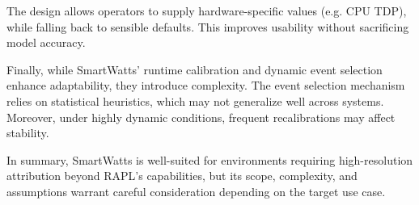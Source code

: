 The design allows operators to supply hardware-specific values (e.g. CPU TDP), while falling back to sensible defaults. This improves usability without sacrificing model accuracy.

Finally, while SmartWatts' runtime calibration and dynamic event selection enhance adaptability, they introduce complexity. The event selection mechanism relies on statistical heuristics, which may not generalize well across systems. Moreover, under highly dynamic conditions, frequent recalibrations may affect stability.

In summary, SmartWatts is well-suited for environments requiring high-resolution attribution beyond RAPL's capabilities, but its scope, complexity, and assumptions warrant careful consideration depending on the target use case.
